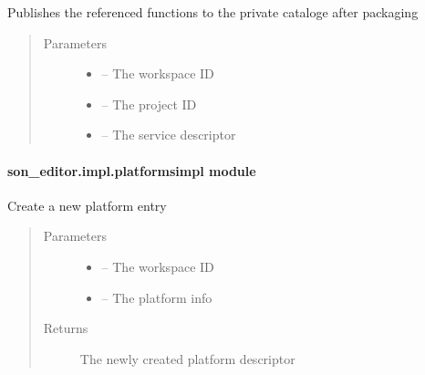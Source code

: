 \documentclass[letterpaper,10pt,english]{sphinxmanual}
\begin{document}
\begin{fulllineitems}
\label{_source/son_editor.impl:son_editor.impl.platform_connector.publish_referenced_functions}
Publishes the referenced functions to the private cataloge after packaging
\begin{quote}\begin{description}
\item[{Parameters}] \leavevmode\begin{itemize}
\item {} 
 -- The workspace ID

\item {} 
 -- The project ID

\item {} 
 -- The service descriptor

\end{itemize}

\end{description}\end{quote}

\end{fulllineitems}



\paragraph{son\_editor.impl.platformsimpl module}
\label{_source/son_editor.impl:son-editor-impl-platformsimpl-module}\label{_source/son_editor.impl:module-son_editor.impl.platformsimpl}

\begin{fulllineitems}
\label{_source/son_editor.impl:son_editor.impl.platformsimpl.create_platform}
Create a new platform entry
\begin{quote}\begin{description}
\item[{Parameters}] \leavevmode\begin{itemize}
\item {} 
 -- The workspace ID

\item {} 
 -- The platform info

\end{itemize}

\item[{Returns}] \leavevmode
The newly created platform descriptor

\end{description}\end{quote}

\end{fulllineitems}
\end{document}
